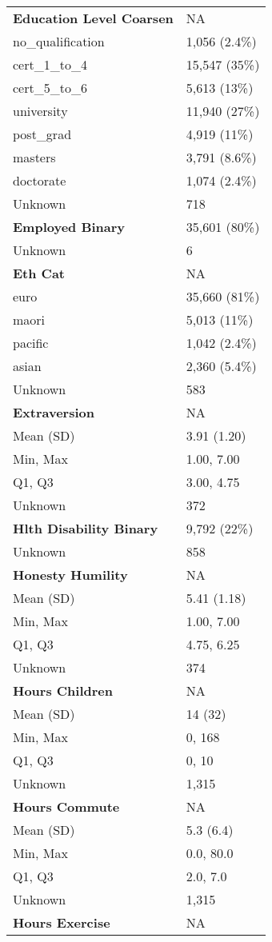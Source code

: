 \documentclass[
  single column]{article}
\begin{document}
\begin{longtable}[]{@{}ll@{}}
\textbf{Education Level Coarsen} & NA \\
no\_qualification & 1,056 (2.4\%) \\
cert\_1\_to\_4 & 15,547 (35\%) \\
cert\_5\_to\_6 & 5,613 (13\%) \\
university & 11,940 (27\%) \\
post\_grad & 4,919 (11\%) \\
masters & 3,791 (8.6\%) \\
doctorate & 1,074 (2.4\%) \\
Unknown & 718 \\
\textbf{Employed Binary} & 35,601 (80\%) \\
Unknown & 6 \\
\textbf{Eth Cat} & NA \\
euro & 35,660 (81\%) \\
maori & 5,013 (11\%) \\
pacific & 1,042 (2.4\%) \\
asian & 2,360 (5.4\%) \\
Unknown & 583 \\
\textbf{Extraversion} & NA \\
Mean (SD) & 3.91 (1.20) \\
Min, Max & 1.00, 7.00 \\
Q1, Q3 & 3.00, 4.75 \\
Unknown & 372 \\
\textbf{Hlth Disability Binary} & 9,792 (22\%) \\
Unknown & 858 \\
\textbf{Honesty Humility} & NA \\
Mean (SD) & 5.41 (1.18) \\
Min, Max & 1.00, 7.00 \\
Q1, Q3 & 4.75, 6.25 \\
Unknown & 374 \\
\textbf{Hours Children} & NA \\
Mean (SD) & 14 (32) \\
Min, Max & 0, 168 \\
Q1, Q3 & 0, 10 \\
Unknown & 1,315 \\
\textbf{Hours Commute} & NA \\
Mean (SD) & 5.3 (6.4) \\
Min, Max & 0.0, 80.0 \\
Q1, Q3 & 2.0, 7.0 \\
Unknown & 1,315 \\
\textbf{Hours Exercise} & NA \\

\end{longtable}
\end{document}
